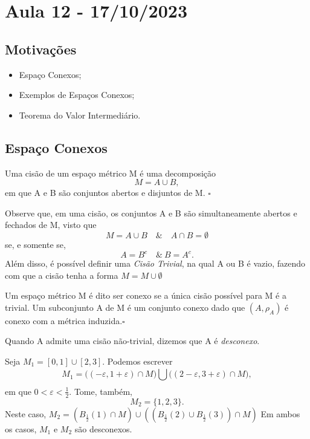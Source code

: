 \documentclass[MetricSpaces/metric_notes.tex]{subfiles}
\begin{document}
\section{Aula 12 - 17/10/2023}
\subsection{Motivações}
\begin{itemize}
	\item Espaço Conexos;
	\item Exemplos de Espaços Conexos;
	\item Teorema do Valor Intermediário.
\end{itemize}
\subsection{Espaço Conexos}
\begin{def*}
	Uma cisão de um espaço métrico M é uma decomposição
	\[
		M = A\cup{B},
	\]
	em que A e B são conjuntos abertos e disjuntos de M. \(\square\)
\end{def*}
Observe que, em uma cisão, os conjuntos A e B são simultaneamente abertos e fechados
de M, visto que
\[
	M = A\cup B\quad\&\quad A\cap B = \emptyset
\]
se, e somente se,
\[
	A = B^{c} \quad\&\ B = A^{c}.
\]
Além disso, é possível definir uma \textit{Cisão Trivial}, na qual A ou B é vazio, fazendo com que
a cisão tenha a forma \(M = M\cup\emptyset\)
\begin{def*}
	Um espaço métrico M é dito ser conexo se a única cisão possível para M é a trivial. Um
	subconjunto A de M é um conjunto conexo dado que \((A, \rho_{A})\) é conexo com a métrica induzida.\(\square\)
\end{def*}
Quando A admite uma cisão não-trivial, dizemos que A é \textit{desconexo}.
\begin{example}
	Seja \(M_{1} = [0,1]\cup [2, 3]\). Podemos escrever
	\[
		M_{1} = \biggl((-\varepsilon , 1 + \varepsilon )\cap M\biggr)\bigcup_{}^{}{\biggl((2-\varepsilon , 3+\varepsilon )\cap M\biggr)},
	\]
	em que \(0 < \varepsilon < \frac{1}{2}.\) Tome, também,
	\[
		M_{2} = \{1, 2, 3\}.
	\]
	Neste caso, \(M_{2} = (B_{\frac{1}{2}}(1)\cap M)\cup ((B_{\frac{1}{2}}(2)\cup B_{\frac{1}{2}}(3))\cap M)\)
	Em ambos os casos, \(M_{1}\) e \(M_{2}\) são desconexos.
\end{example}
\end{document}
